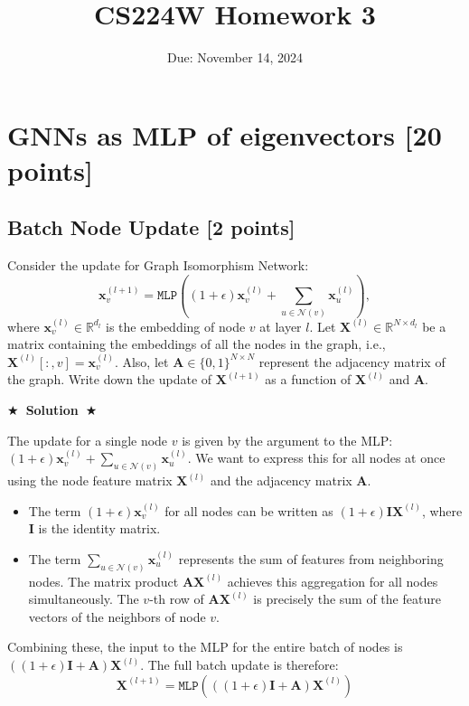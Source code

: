 \documentclass{article}
\title{CS224W Homework 3}
\date{Due: November 14, 2024}
\numberwithin{figure}{section}
\newcommand{\Solution}[1]{%
    {%
        \medskip
        \color{red}
        \bf $\bigstar$~\sf\textbf{Solution}~$\bigstar$ \sf
        #1
    }
    \bigskip
}
\begin{document}
\maketitle

\section{GNNs as MLP of eigenvectors  [20 points]}

\subsection{Batch Node Update [2 points]}
Consider the update for Graph Isomorphism Network:
\begin{equation}
    \mathbf{x}_v^{(l+1)} =  \texttt{MLP}\left(\left( 1+\epsilon\right) \mathbf{x}_v^{(l)}+\sum_{u\in\mathcal{N}\left(v\right)}\mathbf{x}_u^{(l)}\right),
\end{equation}
where $\mathbf{x}_v^{(l)}\in\mathbb{R}^{d_l}$ is the embedding of node $v$ at layer $l$. Let $\mathbf{X}^{(l)}\in\mathbb{R}^{N\times d_l}$ be a matrix containing the embeddings of all the nodes in the graph, i.e., $\mathbf{X}^{(l)}\left[:,v\right]=\mathbf{x}_v^{(l)}$. Also, let $\mathbf{A}\in\{0,1\}^{N\times N}$ represent the adjacency matrix of the graph. Write down the update of $\mathbf{X}^{(l+1)}$ as a function of $\mathbf{X}^{(l)}$ and $\mathbf{A}$.

\Solution{
	The update for a single node $v$ is given by the argument to the MLP: $(1+\epsilon) \mathbf{x}_v^{(l)}+\sum_{u\in\mathcal{N}\left(v\right)}\mathbf{x}_u^{(l)}$. We want to express this for all nodes at once using the node feature matrix $\mathbf{X}^{(l)}$ and the adjacency matrix $\mathbf{A}$.
	
	\begin{itemize}
		\item The term $(1+\epsilon) \mathbf{x}_v^{(l)}$ for all nodes can be written as $(1+\epsilon)\mathbf{I}\mathbf{X}^{(l)}$, where $\mathbf{I}$ is the identity matrix.
		\item The term $\sum_{u\in\mathcal{N}\left(v\right)}\mathbf{x}_u^{(l)}$ represents the sum of features from neighboring nodes. The matrix product $\mathbf{A}\mathbf{X}^{(l)}$ achieves this aggregation for all nodes simultaneously. The $v$-th row of $\mathbf{A}\mathbf{X}^{(l)}$ is precisely the sum of the feature vectors of the neighbors of node $v$.
	\end{itemize}
	
	Combining these, the input to the MLP for the entire batch of nodes is $((1+\epsilon)\mathbf{I} + \mathbf{A})\mathbf{X}^{(l)}$. The full batch update is therefore:
	\begin{equation}
		\mathbf{X}^{(l+1)} = \texttt{MLP}\left(\left( (1+\epsilon)\mathbf{I} + \mathbf{A}\right) \mathbf{X}^{(l)}\right)
	\end{equation}
}
\end{document}
